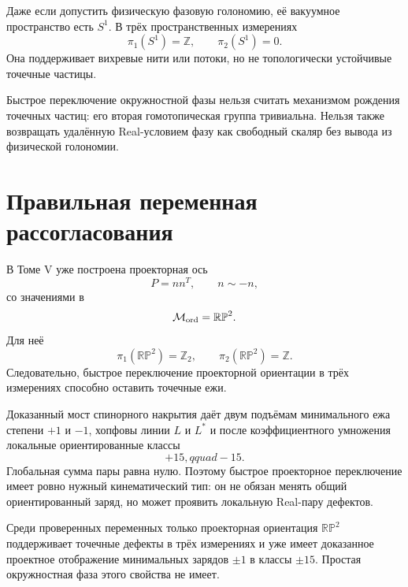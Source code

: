 Даже если допустить физическую фазовую голономию, её вакуумное пространство
есть $S^1$. В трёх пространственных измерениях
\begin{equation}
 \pi_1(S^1)=\mathbb Z,
 \qquad
 \pi_2(S^1)=0.
\end{equation}
Она поддерживает вихревые нити или потоки, но не топологически устойчивые
точечные частицы.

\begin{nogocriterion}
Быстрое переключение окружностной фазы нельзя считать механизмом рождения точечных частиц:
его вторая гомотопическая группа тривиальна. Нельзя также возвращать
удалённую Real-условием фазу как свободный скаляр без вывода из физической
голономии.
\end{nogocriterion}

\section{Правильная переменная рассогласования}

В Томе V уже построена проекторная ось
\begin{equation}
 P=nn^T,
 \qquad n\sim-n,
\end{equation}
со значениями в
\begin{equation}
 \mathcal M_{\rm ord}=\mathbb{RP}^2.
\end{equation}
Для неё
\begin{equation}
 \pi_1(\mathbb{RP}^2)=\mathbb Z_2,
 \qquad
 \pi_2(\mathbb{RP}^2)=\mathbb Z.
\end{equation}
Следовательно, быстрое переключение проекторной ориентации в трёх измерениях способно
оставить точечные ежи.

Доказанный мост спинорного накрытия даёт двум подъёмам минимального ежа степени
$+1$ и $-1$, хопфовы линии $L$ и $L^*$ и после коэффициентного умножения
локальные ориентированные классы
\begin{equation}
 +15,qquad-15.
\end{equation}
Глобальная сумма пары равна нулю. Поэтому быстрое проекторное переключение имеет
ровно нужный кинематический тип: он не обязан менять общий ориентированный
заряд, но может проявить локальную Real-пару дефектов.

\begin{theorem}
Среди проверенных переменных только проекторная ориентация
$\mathbb{RP}^2$ поддерживает точечные дефекты в трёх измерениях и уже имеет
доказанное проектное отображение минимальных зарядов $\pm1$ в классы
$\pm15$. Простая окружностная фаза этого свойства не имеет.
\end{theorem}


